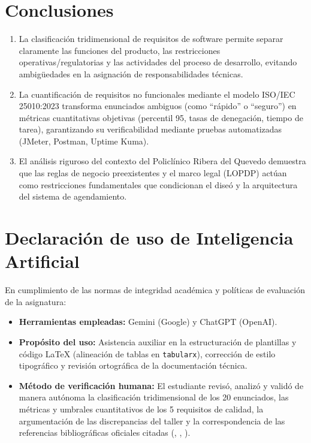 \documentclass[conference]{IEEEtran}
\begin{document}
	\section{Conclusiones}
	\begin{enumerate}
		\item La clasificaci\'on tridimensional de requisitos de software permite separar claramente las funciones del producto, las restricciones operativas/regulatorias y las actividades del proceso de desarrollo, evitando ambig\"uedades en la asignaci\'on de responsabilidades t\'ecnicas.
		\item La cuantificaci\'on de requisitos no funcionales mediante el modelo ISO/IEC 25010:2023 transforma enunciados ambiguos (como ``r\'apido'' o ``seguro'') en m\'etricas cuantitativas objetivas (percentil 95, tasas de denegaci\'on, tiempo de tarea), garantizando su verificabilidad mediante pruebas automatizadas (JMeter, Postman, Uptime Kuma).
		\item El an\'alisis riguroso del contexto del Policl\'inico Ribera del Quevedo demuestra que las reglas de negocio preexistentes y el marco legal (LOPDP) act\'uan como restricciones fundamentales que condicionan el dise\'o y la arquitectura del sistema de agendamiento.
	\end{enumerate}
	
		\nocite{*} %
		\printbibliography[title={Referencias}]
		
		\section*{Declaraci\'on de uso de Inteligencia Artificial}
		En cumplimiento de las normas de integridad acad\'emica y pol\'iticas de evaluaci\'on de la asignatura:
		\begin{itemize}[leftmargin=*,itemsep=2pt,topsep=2pt]
			\item \textbf{Herramientas empleadas:} Gemini (Google) y ChatGPT (OpenAI).
			\item \textbf{Prop\'osito del uso:} Asistencia auxiliar en la estructuraci\'on de plantillas y c\'odigo \LaTeX{} (alineaci\'on de tablas en \texttt{tabularx}), correcci\'on de estilo tipogr\'afico y revisi\'on ortogr\'afica de la documentaci\'on t\'ecnica.
			\item \textbf{M\'etodo de verificaci\'on humana:} El estudiante revis\'o, analiz\'o y valid\'o de manera aut\'onoma la clasificaci\'on tridimensional de los 20 enunciados, las m\'etricas y umbrales cuantitativos de los 5 requisitos de calidad, la argumentaci\'on de las discrepancias del taller y la correspondencia de las referencias bibliogr\'aficas oficiales citadas (\cite{iso29148}, \cite{iso25010}, \cite{pohl2025}).
		\end{itemize}
		
	
\end{document}
